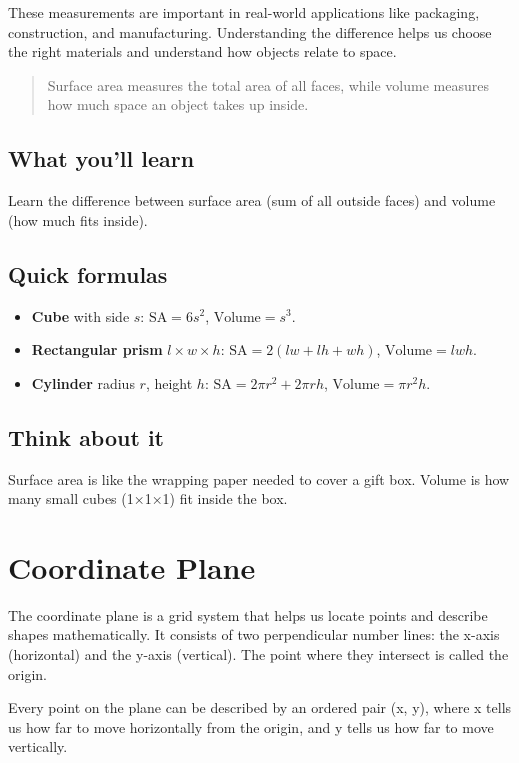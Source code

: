 These measurements are important in real-world applications like packaging,
construction, and manufacturing. Understanding the difference helps us choose the
right materials and understand how objects relate to space.

\blockquote{Surface area measures the total area of all faces, while volume
measures how much space an object takes up inside.}

\subsection{What you'll learn}

Learn the difference between surface area (sum of all outside faces) and volume
(how much fits inside).

\subsection{Quick formulas}

\begin{itemize}
  \item \textbf{Cube} with side \(s\): \(\text{SA}=6s^{2}\), \(\text{Volume}=s^{3}\).
  \item \textbf{Rectangular prism} \(l\times w\times h\): \(\text{SA}=2(lw+lh+wh)\), \(\text{Volume}=lwh\).
  \item \textbf{Cylinder} radius \(r\), height \(h\): \(\text{SA}=2\pi r^{2}+2\pi r h\), \(\text{Volume}=\pi r^{2}h\).
\end{itemize}

\subsection{Think about it}

Surface area is like the wrapping paper needed to cover a gift box. Volume is how
many small cubes (1×1×1) fit inside the box.


\section{Coordinate Plane}

The coordinate plane is a grid system that helps us locate points and describe
shapes mathematically. It consists of two perpendicular number lines: the x-axis
(horizontal) and the y-axis (vertical). The point where they intersect is called
the origin.

Every point on the plane can be described by an ordered pair (x, y), where x
tells us how far to move horizontally from the origin, and y tells us how far to
move vertically.


